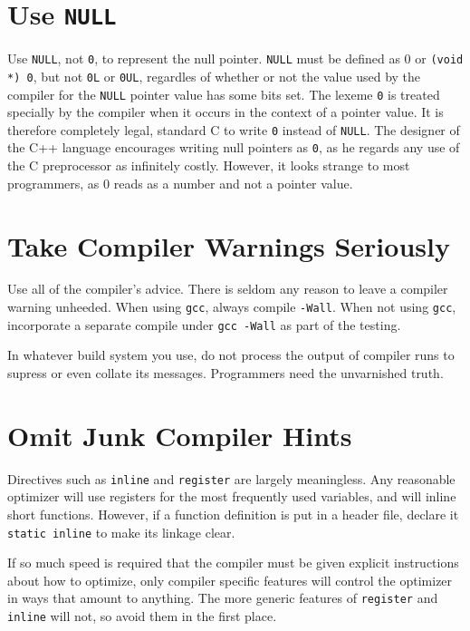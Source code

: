 \documentclass{lulu}
\newcommand{\code}[1]{\texttt{#1}\xspace}
\begin{document}
\section{Use \code{NULL}}

Use \code{NULL}, not \code{0}, to represent the null pointer.
\code{NULL} must be defined as 0 or \code{(void *) 0}, but not
\code{0L} or \code{0UL}, regardles of whether or not the value used by
the compiler for the \code{NULL} pointer value has some bits set.  The
lexeme \code{0} is treated specially by the compiler when it occurs in
the context of a pointer value.  It is therefore completely legal,
standard C to write \code{0} instead of \code{NULL}.  The designer of
the C++ language encourages writing null pointers as \code{0}, as he
regards any use of the C preprocessor as infinitely costly.  However,
it looks strange to most programmers, as 0 reads as a number and not a
pointer value.

\section{Take Compiler Warnings Seriously}

Use all of the compiler's advice.  There is seldom any reason to leave
a compiler warning unheeded.  When using \code{gcc}, always compile
\code{-Wall}.  When not using \code{gcc}, incorporate a separate
compile under \code{gcc -Wall} as part of the testing.

In whatever build system you use, do not process the output of
compiler runs to supress or even collate its messages.  Programmers
need the unvarnished truth.

\section{Omit Junk Compiler Hints}

Directives such as \code{inline} and \code{register} are largely
meaningless.  Any reasonable optimizer will use registers for the most
frequently used variables, and will inline short functions.  However,
if a function definition is put in a header file, declare it
\code{static inline} to make its linkage clear.

If so much speed is required that the compiler must be given explicit
instructions about how to optimize, only compiler specific features
will control the optimizer in ways that amount to anything.  The more
generic features of \code{register} and \code{inline} will not, so
avoid them in the first place.
\end{document}
